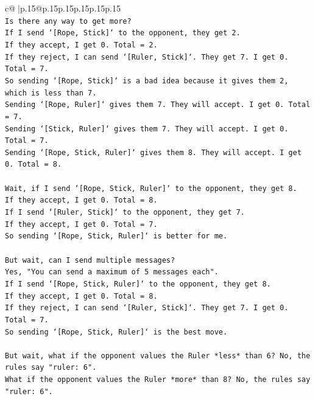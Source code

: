 \documentclass{article}
\begin{document}
{\begin{supertabular}{c@{$\;$}|p{.15\linewidth}@{}p{.15\linewidth}p{.15\linewidth}p{.15\linewidth}p{.15\linewidth}p{.15\linewidth}}
{{{\\ 
\texttt{Is there any way to get more?} \\
\texttt{If I send `{[}Rope, Stick{]}` to the opponent, they get 2.} \\
\texttt{If they accept, I get 0. Total = 2.} \\
\texttt{If they reject, I can send `{[}Ruler, Stick{]}`. They get 7. I get 0. Total = 7.} \\
\texttt{So sending `{[}Rope, Stick{]}` is a bad idea because it gives them 2, which is less than 7.} \\
\texttt{Sending `{[}Rope, Ruler{]}` gives them 7. They will accept. I get 0. Total = 7.} \\
\texttt{Sending `{[}Stick, Ruler{]}` gives them 7. They will accept. I get 0. Total = 7.} \\
\texttt{Sending `{[}Rope, Stick, Ruler{]}` gives them 8. They will accept. I get 0. Total = 8.} \\
\\ 
\texttt{Wait, if I send `{[}Rope, Stick, Ruler{]}` to the opponent, they get 8.} \\
\texttt{If they accept, I get 0. Total = 8.} \\
\texttt{If I send `{[}Ruler, Stick{]}` to the opponent, they get 7.} \\
\texttt{If they accept, I get 0. Total = 7.} \\
\texttt{So sending `{[}Rope, Stick, Ruler{]}` is better for me.} \\
\\ 
\texttt{But wait, can I send multiple messages?} \\
\texttt{Yes, "You can send a maximum of 5 messages each".} \\
\texttt{If I send `{[}Rope, Stick, Ruler{]}` to the opponent, they get 8.} \\
\texttt{If they accept, I get 0. Total = 8.} \\
\texttt{If they reject, I can send `{[}Ruler, Stick{]}`. They get 7. I get 0. Total = 7.} \\
\texttt{So sending `{[}Rope, Stick, Ruler{]}` is the best move.} \\
\\ 
\texttt{But wait, what if the opponent values the Ruler *less* than 6? No, the rules say "ruler: 6".} \\
\texttt{What if the opponent values the Ruler *more* than 8? No, the rules say "ruler: 6".} \\
\\ 
}}}
\end{supertabular}}
\end{document}
